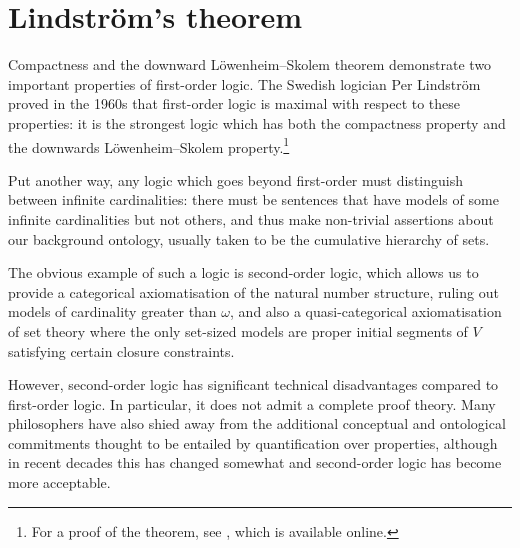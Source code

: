 \documentclass[10pt, a4paper, oneside]{article}
\theoremstyle{definition}
\theoremstyle{remark}
\theoremstyle{plain}
\theoremstyle{plain}
\begin{document}
\section{Lindström's theorem}

Compactness and the downward Löwenheim--Skolem theorem demonstrate two
important properties of first-order logic. The Swedish logician Per Lindström
proved in the 1960s that first-order logic is maximal with respect to these
properties: it is the strongest logic which has both the compactness property
and the downwards Löwenheim--Skolem property.\footnote{For a proof of the
theorem, see \citet{vaananen2010}, which is available online.}

Put another way, any logic which goes beyond first-order must distinguish
between infinite cardinalities: there must be sentences that have models of
some infinite cardinalities but not others, and thus make non-trivial assertions
about our background ontology, usually taken to be the cumulative hierarchy of
sets.

The obvious example of such a logic is second-order logic, which allows us to
provide a categorical axiomatisation of the natural number structure, ruling out
models of cardinality greater than $\omega$, and also a quasi-categorical
axiomatisation of set theory where the only set-sized models are proper initial
segments of $V$ satisfying certain closure constraints.

However, second-order logic has significant technical disadvantages compared to
first-order logic. In particular, it does not admit a complete proof theory.
Many philosophers have also shied away from the additional conceptual and
ontological commitments thought to be entailed by quantification over
properties, although in recent decades this has changed somewhat and
second-order logic has become more acceptable.



\end{document}
